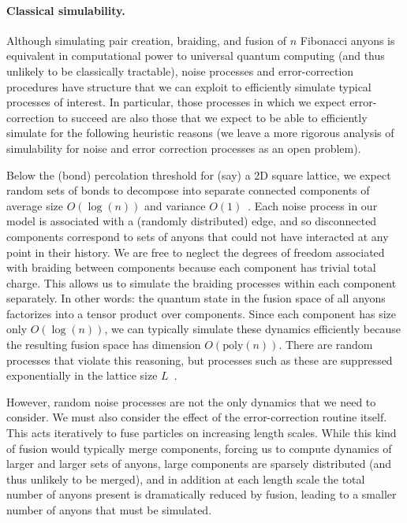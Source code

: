 \documentclass[aps, prl, letterpaper, twocolumn, superscriptaddress, notitlepage, 10pt]{revtex4-1}
\begin{document}
\paragraph{Classical simulability.}

Although simulating pair creation, braiding, and fusion of $n$ Fibonacci anyons is equivalent 
in computational power to universal quantum computing (and thus unlikely to be classically 
tractable), noise processes and error-correction procedures have structure that we can 
exploit to efficiently simulate typical processes of interest. In particular, those 
processes in which we expect error-correction to succeed are also those that we expect to 
be able to efficiently simulate for the following heuristic reasons 
(we leave a more rigorous analysis of simulability for noise 
and error correction processes as an open problem).

Below the (bond) percolation threshold for (say) a 2D square lattice, we expect random sets of 
bonds to decompose into separate connected components 
of average size $O(\log(n))$ and variance $O(1)$~\cite{Bazant2000}.
Each noise process in our model is associated with a (randomly distributed) edge, and so 
disconnected components correspond to sets of anyons that could not have interacted at any 
point in their history. 
We are free to neglect the degrees of freedom associated with braiding between components 
because each component has trivial total charge.
This allows us to simulate the braiding processes within each component separately. 
In other words: the quantum state in the fusion space of all anyons factorizes into 
a tensor product over components. 
Since each 
component has size only $O(\log(n))$, we can typically simulate these dynamics efficiently 
because the resulting fusion space has dimension $O(\mathrm{poly}(n))$. 
There are 
random processes that violate this reasoning, but processes such as these are suppressed 
exponentially in the lattice size $L$~\cite{Grimmett1989}. 

However, random noise processes are not the only dynamics that we need to consider. We 
must also consider the effect of the error-correction routine itself. This acts iteratively to fuse 
particles on increasing length scales. While this kind of fusion would typically merge components, 
forcing us to compute dynamics of larger and larger sets of anyons,
large components are sparsely distributed 
(and thus unlikely to be merged), and in addition at each length scale the total number of 
anyons present is dramatically reduced by fusion, leading to a smaller number of anyons that 
must be simulated.
\end{document}

